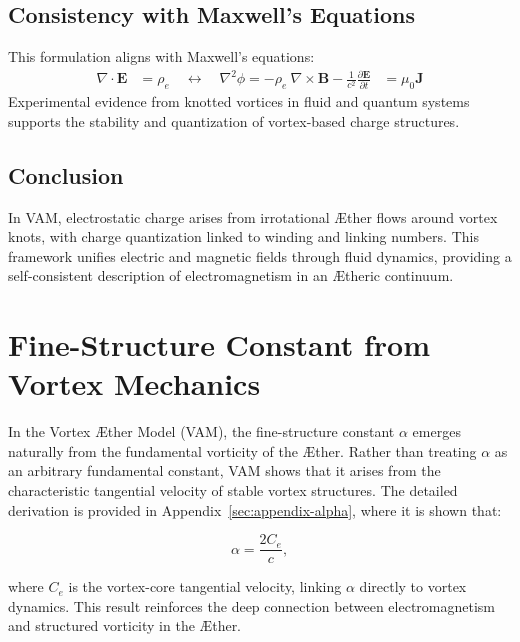 \documentclass[aps,preprint,superscriptaddress]{revtex4-2}
\begin{document}
\subsection{Consistency with Maxwell’s Equations}


This formulation aligns with Maxwell’s equations:
\begin{align}
\nabla \cdot \mathbf{E} &= \rho_e \quad \leftrightarrow \quad \nabla^2 \phi = -\rho_e\
\nabla \times \mathbf{B} - \frac{1}{c^2}\frac{\partial \mathbf{E}}{\partial t} &= \mu_0 \mathbf{J}
\end{align}
Experimental evidence from knotted vortices in fluid and quantum systems supports the stability and quantization of vortex-based charge structures.


\subsection{Conclusion}


In VAM, electrostatic charge arises from irrotational Æther flows around vortex knots, with charge quantization linked to winding and linking numbers. This framework unifies electric and magnetic fields through fluid dynamics, providing a self-consistent description of electromagnetism in an Ætheric continuum.




    \section{Fine-Structure Constant from Vortex Mechanics}

    In the Vortex \AE ther Model (VAM), the fine-structure constant $\alpha$ emerges naturally from the fundamental vorticity of the \AE ther. Rather than treating $\alpha$ as an arbitrary fundamental constant, VAM shows that it arises from the characteristic tangential velocity of stable vortex structures. The detailed derivation is provided in Appendix~\ref{sec:appendix-alpha}, where it is shown that:

    \begin{equation}
        \alpha = \frac{2 C_e}{c},
    \end{equation}

    where $C_e$ is the vortex-core tangential velocity, linking $\alpha$ directly to vortex dynamics. This result reinforces the deep connection between electromagnetism and structured vorticity in the \AE ther.
\end{document}
